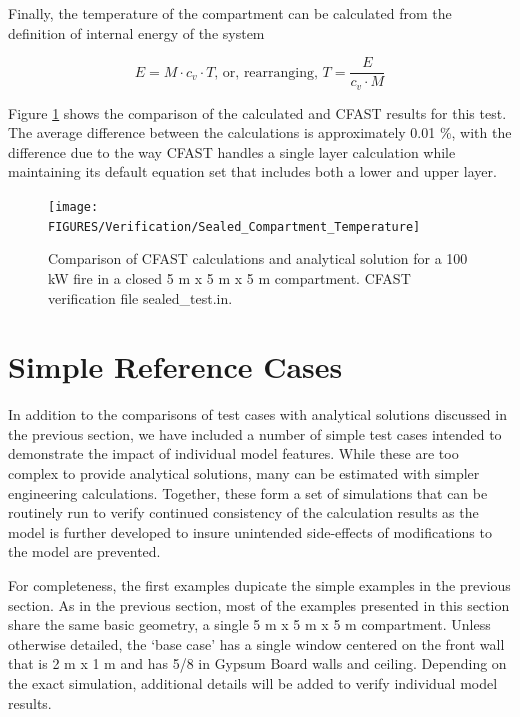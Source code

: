Finally, the temperature of the compartment can be calculated from the definition of internal energy of the system

\begin{equation}
E = M \cdot c_v \cdot T \text{, or, rearranging, } T = \frac{E}{c_v \cdot M}
\end{equation} 

Figure \ref{fig:Analytical_Closed_Compartment} shows the comparison of the calculated and CFAST results for this test. The average difference between the calculations is approximately 0.01 \%, with the difference due to the way CFAST handles a single layer calculation while maintaining its default equation set that includes both a lower and upper layer.

\begin{figure}
\begin{center}
\texttt{[image: FIGURES/Verification/Sealed\_Compartment\_Temperature]}
\caption{Comparison of CFAST calculations and analytical solution for a 100 kW fire in a closed 5 m x 5 m x 5 m compartment.  CFAST verification file sealed\_test.in.}
\label{fig:Analytical_Closed_Compartment}
\end{center}
\end{figure}

\section{Simple Reference Cases}

In addition to the comparisons of test cases with analytical solutions discussed in the previous section, we have included a number of simple test cases intended to demonstrate the impact of individual model features.  While these are too complex to provide analytical solutions, many can be estimated with simpler engineering calculations.  Together, these form a set of simulations that can be routinely run to verify continued consistency of the calculation results as the model is further developed to insure unintended side-effects of modifications to the model are prevented.

For completeness, the first examples dupicate the simple examples in the previous section. As in the previous section,  most of the examples presented in this section share the same basic geometry, a single 5 m x 5 m x 5 m compartment. Unless otherwise detailed, the ‘base case’ has a single window centered on the front wall that is 2 m x 1 m and has 5/8 in Gypsum Board walls and ceiling. Depending on the exact simulation, additional details will be added to verify individual model results. 

